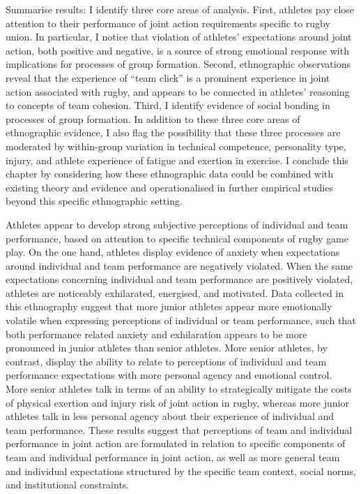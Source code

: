 \begin{CJK}{UTF8}{gbsn}
Summarise results:
 I identify three core areas of analysis.  First, athletes pay close attention to their performance of joint action requirements specific to rugby union.  In particular, I notice that violation of athletes' expectations around joint action, both positive and negative, is a source of strong emotional response with implications for processes of group formation.  Second, ethnographic observations reveal that the experience of ``team click'' is a prominent experience in joint action associated with rugby, and appears to be connected in athletes' reasoning to concepts of team cohesion.  Third, I identify evidence of social bonding in processes of group formation.  In addition to these three core areas of ethnographic evidence, I also flag the possibility that these three processes are moderated by within-group variation in technical competence, personality type, injury, and athlete experience of fatigue and exertion in exercise.  I conclude this chapter by considering how these ethnographic data could be combined with existing theory and evidence and operationalised in further empirical studies beyond this specific ethnographic setting.

Athletes appear to develop strong subjective perceptions of individual and team performance, based on attention to specific technical components of rugby game play.   On the one hand, athletes display evidence of anxiety when expectations around individual and team performance are negatively violated.  When the same expectations concerning individual and team performance are positively violated, athletes are noticeably exhilarated, energised, and motivated.  Data collected in this ethnography suggest that more junior athletes appear more emotionally volatile when expressing perceptions of individual or team performance, such that both performance related anxiety and exhilaration appears to be more pronounced in junior athletes than senior athletes.  More senior athletes, by contrast, display the ability to relate to perceptions of individual and team performance expectations with more personal agency and emotional control.  More senior athletes talk in terms of an ability to strategically mitigate the costs of physical exertion and injury risk of joint action in rugby, whereas more junior athletes talk in less personal agency about their experience of individual and team performance.  These results suggest that perceptions of team and individual performance in joint action are formulated in relation to specific components of team and individual performance in joint action, as well as more general team and individual expectations structured by the specific team context, social norms, and institutional constraints.


\end{CJK}
